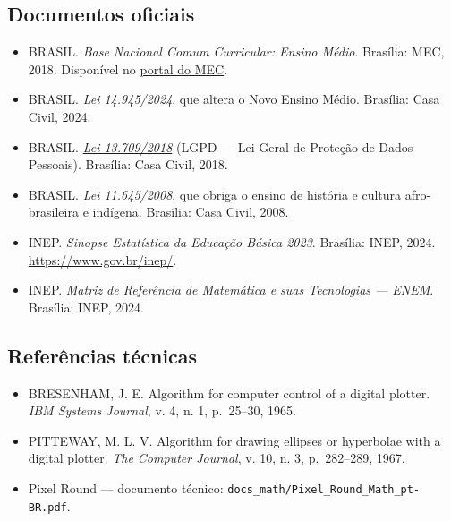 \documentclass[12pt,a4paper]{scrartcl}
\begin{document}
\subsection{Documentos oficiais}
\begin{itemize}[leftmargin=1.3em,itemsep=0.15em,topsep=0.3em]
  \item BRASIL. \emph{Base Nacional Comum Curricular: Ensino Médio}. Brasília: MEC, 2018. Disponível no \href{https://www.gov.br/mec/}{portal do MEC}.
  \item BRASIL. \emph{Lei 14.945/2024}, que altera o Novo Ensino Médio. Brasília: Casa Civil, 2024.
  \item BRASIL. \href{https://www.planalto.gov.br/ccivil_03/_ato2015-2018/2018/lei/l13709.htm}{\emph{Lei 13.709/2018}} (LGPD --- Lei Geral de Proteção de Dados Pessoais). Brasília: Casa Civil, 2018.
  \item BRASIL. \href{https://www.planalto.gov.br/ccivil_03/_ato2007-2010/2008/lei/l11645.htm}{\emph{Lei 11.645/2008}}, que obriga o ensino de história e cultura afro-brasileira e indígena. Brasília: Casa Civil, 2008.
  \item INEP. \emph{Sinopse Estatística da Educação Básica 2023}. Brasília: INEP, 2024. \url{https://www.gov.br/inep/}.
  \item INEP. \emph{Matriz de Referência de Matemática e suas Tecnologias --- ENEM}. Brasília: INEP, 2024.
\end{itemize}

\subsection{Referências técnicas}
\begin{itemize}[leftmargin=1.3em,itemsep=0.15em,topsep=0.3em]
  \item BRESENHAM, J. E. Algorithm for computer control of a digital plotter. \emph{IBM Systems Journal}, v. 4, n. 1, p.~25--30, 1965.
  \item PITTEWAY, M. L. V. Algorithm for drawing ellipses or hyperbolae with a digital plotter. \emph{The Computer Journal}, v. 10, n. 3, p.~282--289, 1967.
  \item Pixel Round --- documento técnico: \texttt{docs\_math/Pixel\_Round\_Math\_pt-BR.pdf}.
\end{itemize}
\end{document}
